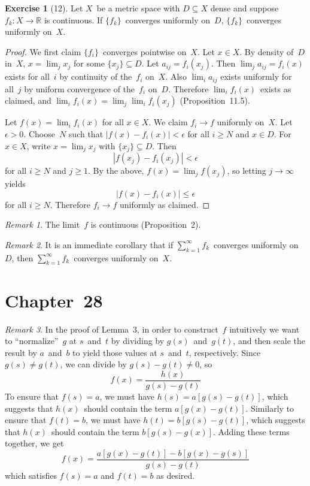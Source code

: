 \documentclass[letterpaper,12pt]{article}
\newcommand{\R}{\mathbb{R}}
\newcommand{\abs}[1]{|{#1}|}
\theoremstyle{plain}
\theoremstyle{definition}
\newtheorem*{exer}{Exercise}
\theoremstyle{remark}
\newtheorem*{rmk}{Remark}
\begin{document}
\begin{exer}[12]
Let \(X\)~be a metric space with \(D\subseteq X\) dense and suppose \(f_k:X\to\R\) is continuous. If \(\{f_k\}\)~converges uniformly on~\(D\), \(\{f_k\}\)~converges uniformly on~\(X\).
\end{exer}
\begin{proof}
We first claim \(\{f_i\}\)~converges pointwise on~\(X\). Let \(x\in X\). By density of~\(D\) in~\(X\), \(x=\lim_j x_j\) for some \(\{x_j\}\subseteq D\). Let \(a_{ij}=f_i(x_j)\). Then \(\lim_j a_{ij}=f_i(x)\) exists for all~\(i\) by continuity of the~\(f_i\) on~\(X\). Also \(\lim_i a_{ij}\) exists uniformly for all~\(j\) by uniform convergence of the~\(f_i\) on~\(D\). Therefore \(\lim_i f_i(x)\)~exists as claimed, and \(\lim_i f_i(x)=\lim_j\lim_i f_i(x_j)\) (Proposition~11.5).

Let \(f(x)=\lim_i f_i(x)\) for all \(x\in X\). We claim \(f_i\to f\) uniformly on~\(X\). Let \(\epsilon>0\). Choose~\(N\) such that \(\abs{f(x)-f_i(x)}<\epsilon\) for all \(i\ge N\) and \(x\in D\). For \(x\in X\), write \(x=\lim_j x_j\) with \(\{x_j\}\subseteq D\). Then
\[\abs{f(x_j)-f_i(x_j)}<\epsilon\]
for all \(i\ge N\) and \(j\ge 1\). By the above, \(f(x)=\lim_j f(x_j)\), so letting \(j\to\infty\) yields
\[\abs{f(x)-f_i(x)}\le\epsilon\]
for all \(i\ge N\). Therefore \(f_i\to f\) uniformly as claimed.
\end{proof}
\begin{rmk}
The limit~\(f\) is continuous (Proposition~2).
\end{rmk}
\begin{rmk}
It is an immediate corollary that if \(\sum_{k=1}^{\infty}f_k\)~converges uniformly on~\(D\), then \(\sum_{k=1}^{\infty}f_k\)~converges uniformly on~\(X\).
\end{rmk}

\section*{Chapter~28}
\begin{rmk}
In the proof of Lemma~3, in order to construct~\(f\) intuitively we want to ``normalize''~\(g\) at \(s\)~and~\(t\) by dividing by \(g(s)\)~and~\(g(t)\), and then scale the result by \(a\)~and~\(b\) to yield those values at \(s\)~and~\(t\), respectively. Since \(g(s)\ne g(t)\), we can divide by \(g(s)-g(t)\ne0\), so
\[f(x)=\frac{h(x)}{g(s)-g(t)}\]
To ensure that \(f(s)=a\), we must have \(h(s)=a[g(s)-g(t)]\), which suggests that \(h(x)\)~should contain the term \(a[g(x)-g(t)]\). Similarly to ensure that \(f(t)=b\), we must have \(h(t)=b[g(s)-g(t)]\), which suggests that \(h(x)\)~should contain the term \(b[g(s)-g(x)]\). Adding these terms together, we get
\[f(x)=\frac{a[g(x)-g(t)]-b[g(x)-g(s)]}{g(s)-g(t)}\]
which satisfies \(f(s)=a\) and \(f(t)=b\) as desired.
\end{rmk}
\end{document}

